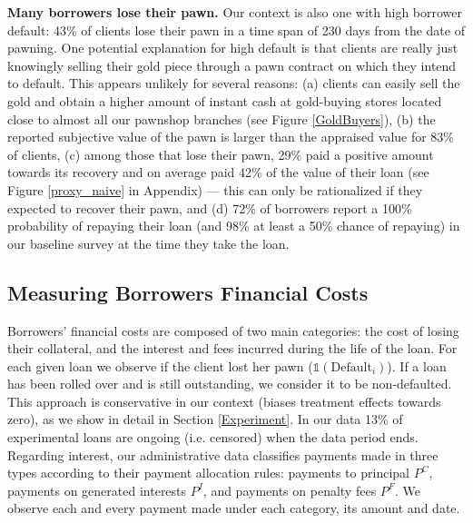 \documentclass[ecta,nameyear,final]{econsocart}
\begin{document}
\noindent \textbf{Many borrowers lose their pawn.} Our context is also one with high borrower default: 43\% of clients lose their pawn in a time span of 230 days from the date of pawning. One potential explanation for high default is that clients are really just knowingly selling their gold piece through a pawn contract on which they intend to default. This appears unlikely for several reasons: (a) clients can easily sell the gold and obtain a higher amount of instant cash at gold-buying stores located close to almost all our pawnshop branches (see Figure \ref{GoldBuyers}), (b) the reported subjective value of the pawn is larger than the appraised value for 83\% of clients, (c) among those that lose their pawn, 29\% paid a positive amount towards its recovery and on average paid 42\% of the value of their loan (see Figure \ref{proxy_naive} in Appendix) --- this can only be rationalized if they expected to recover their pawn, and (d) 72\% of borrowers report a 100\% probability of repaying their loan (and 98\% at least a 50\% chance of repaying) in our baseline survey at the time they take the loan.  %

    
\subsection{Measuring Borrowers Financial Costs} 
\label{costs}
    
Borrowers' financial costs are composed of two main categories: the cost of losing their collateral, and the interest and fees incurred during the life of the loan. For each given loan we observe if the client lost her pawn ($\mathds{1}(\text{Default}_i)$). If a loan has been rolled over and is still outstanding, we consider it to be non-defaulted.  This approach is conservative in our context (biases treatment effects towards zero), as we show in detail in Section \ref{Experiment}. In our data 13\% of experimental loans are ongoing (i.e. censored) when the data period ends. Regarding interest, our administrative data classifies payments made in three types according to their payment allocation rules: payments to principal $P^C$, payments on generated interests $P^I$, and payments on penalty fees $P^F$. We observe each and every payment made under each category, its amount and date. 
\end{document}
